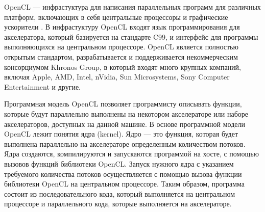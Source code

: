 OpenCL  — инфрастуктура для 
написания параллельных программ для различных платформ, включающих в
себя центральные процессоры и графические ускорители . В инфрастуктуру OpenCL
входят язык программирования для акселератора, который базируется на стандарте C99, и
интерфейс для программы выполняющихся на центральном процессоре. OpenCL является
полностью открытым стандартом, разрабатывается и поддерживается некоммерческим консорциумом Khronos Group, 
в который входят много крупных компаний, включая Apple, AMD, Intel, nVidia, Sun Microsystems, Sony 
Computer Entertainment и другие.

Программная модель OpenCL позволяет программисту описывать функции, которые будут
параллельно выполнены на некотором акселераторе или наборе акселераторов, доступных на
данной машине.
В основе программной модели OpenCL лежит понятия ядра (kernel). Ядро — это функция,
которая будет выполнена параллельно на акселераторе определенным количеством
потоков. Ядра создаются, компилируются и запускаются программой на хосте, с помощью
вызовов функций библиотеки OpenCL. Запуск нужного ядра с указанием требуемого количества потоков
осуществляется с помощью вызова функции библиотеки OpenCL на центральном
процессоре. Таким образом, программа состоит из последовательного кода, который выполняется
на центральном процессоре и параллельного кода, которые выполняется на
акселераторе.
